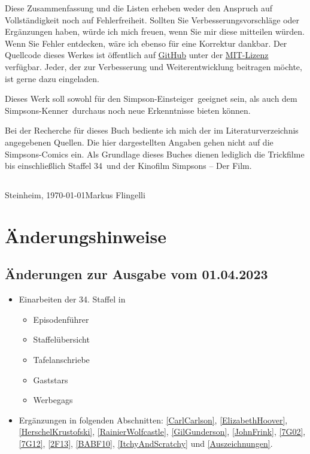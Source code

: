 \documentclass[pagesize,twoside,german]{scrbook}
\newcommand{\staffelAnzahl}{34}
\begin{document}
Diese Zusammenfassung und die Listen erheben weder den Anspruch auf Voll\-stän\-dig\-keit noch auf Fehlerfreiheit. Sollten Sie Verbesserungsvorschläge oder Er\-gänz\-un\-gen haben, würde ich mich freuen, wenn Sie mir diese mitteilen würden. Wenn Sie Fehler entdecken, wäre ich ebenso für eine Korrektur dankbar. Der Quellcode dieses Werkes ist öffentlich auf \href{https://github.com/mflingelli/simpsons}{GitHub} unter der \href{https://github.com/mflingelli/simpsons/blob/development/LICENSE.md}{MIT-Lizenz} verfügbar. Jeder, der zur Verbesserung und Weiterentwicklung beitragen möchte, ist gerne dazu eingeladen.

Dieses Werk soll sowohl für den \glqq Simpson-Einsteiger\grqq\ geeignet sein, als auch dem \glqq Simpsons-Kenner\grqq\ durchaus noch neue Erkenntnisse bieten können.

Bei der Recherche für dieses Buch bediente ich mich der im Literaturverzeichnis angegebenen Quellen. Die hier dargestellten Angaben gehen nicht auf die Simpsons-Comics ein. Als Grundlage dieses Buches dienen lediglich die Trickfilme bis einschließlich Staffel \staffelAnzahl\ und der Kinofilm \glqq Simpsons -- Der Film\grqq .

\subsection*{}
{
Steinheim, \today \hfill Markus Flingelli
}


\section*{Änderungshinweise}

\subsection*{Änderungen zur Ausgabe vom 01.04.2023}
\begin{itemize}
	\item Einarbeiten der 34. Staffel in
	\begin{itemize}
		\item Episodenführer
		\item Staffelübersicht
		\item Tafelanschriebe
		\item Gaststars
		\item Werbegags
	\end{itemize}
	\item Ergänzungen in folgenden Abschnitten: \ref{CarlCarlson}, \ref{ElizabethHoover}, \ref{HerschelKrustofski}, \ref{RainierWolfcastle}, \ref{GilGunderson}, \ref{JohnFrink}, \ref{7G02}, \ref{7G12}, \ref{2F13}, \ref{BABF10}, \ref{ItchyAndScratchy} und \ref{Auszeichnungen}.
\end{itemize}
\end{document}

